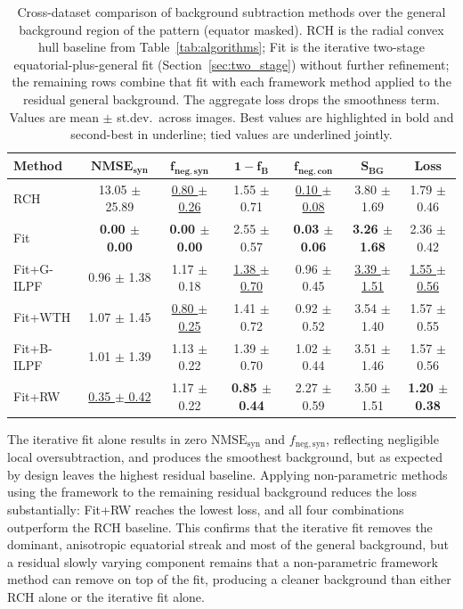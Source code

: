\documentclass[iucr]{iucrjournals}
\begin{document}
\begin{table}[H]
\caption{Cross-dataset comparison of background subtraction methods over the general background region of the pattern (equator masked). RCH is the radial convex hull baseline from Table~\ref{tab:algorithms}; Fit is the iterative two-stage equatorial-plus-general fit (Section~\ref{sec:two_stage}) without further refinement; the remaining rows combine that fit with each framework method applied to the residual general background. The aggregate loss drops the smoothness term. Values are mean $\pm$ st.dev.\ across images. Best values are highlighted in bold and second-best in underline; tied values are underlined jointly.}
\label{tab:two_stage_full}
\centering
\small
\setlength{\tabcolsep}{3pt}
\renewcommand{\arraystretch}{1.1}
\begin{tabular}{@{}lcccccc@{}}
\toprule
\textbf{Method} & $\mathbf{NMSE}_{\mathbf{syn}}$ & $\mathbf{f}_{\mathbf{neg,syn}}$ & $\mathbf{1-f_B}$ & $\mathbf{f}_{\mathbf{neg,con}}$ & $\mathbf{S}_{\mathbf{BG}}$ & \textbf{Loss} \\
\midrule
RCH & 13.05 $\pm$ 25.89 & \underline{0.80 $\pm$ 0.26} & 1.55 $\pm$ 0.71 & \underline{0.10 $\pm$ 0.08} & 3.80 $\pm$ 1.69 & 1.79 $\pm$ 0.46 \\
Fit & \textbf{0.00 $\pm$ 0.00} & \textbf{0.00 $\pm$ 0.00} & 2.55 $\pm$ 0.57 & \textbf{0.03 $\pm$ 0.06} & \textbf{3.26 $\pm$ 1.68} & 2.36 $\pm$ 0.42 \\
Fit+G-ILPF & 0.96 $\pm$ 1.38 & 1.17 $\pm$ 0.18 & \underline{1.38 $\pm$ 0.70} & 0.96 $\pm$ 0.45 & \underline{3.39 $\pm$ 1.51} & \underline{1.55 $\pm$ 0.56} \\
Fit+WTH & 1.07 $\pm$ 1.45 & \underline{0.80 $\pm$ 0.25} & 1.41 $\pm$ 0.72 & 0.92 $\pm$ 0.52 & 3.54 $\pm$ 1.40 & 1.57 $\pm$ 0.55 \\
Fit+B-ILPF & 1.01 $\pm$ 1.39 & 1.13 $\pm$ 0.22 & 1.39 $\pm$ 0.70 & 1.02 $\pm$ 0.44 & 3.51 $\pm$ 1.46 & 1.57 $\pm$ 0.56 \\
Fit+RW & \underline{0.35 $\pm$ 0.42} & 1.17 $\pm$ 0.22 & \textbf{0.85 $\pm$ 0.44} & 2.27 $\pm$ 0.59 & 3.50 $\pm$ 1.51 & \textbf{1.20 $\pm$ 0.38} \\
\bottomrule
\end{tabular}
\end{table}






The iterative fit alone results in zero $\mathrm{NMSE}_{\mathrm{syn}}$ and $f_{\mathrm{neg,syn}}$, reflecting negligible local oversubtraction, and produces the smoothest background, but as expected by design leaves the highest residual baseline. Applying non-parametric methods using the framework to the remaining residual background reduces the loss substantially: Fit+RW reaches the lowest loss, and all four combinations outperform the RCH baseline. This confirms that the iterative fit removes the dominant, anisotropic equatorial streak and most of the general background, but a residual slowly varying component remains that a non-parametric framework method can remove on top of the fit, producing a cleaner background than either RCH alone or the iterative fit alone.
\end{document}
